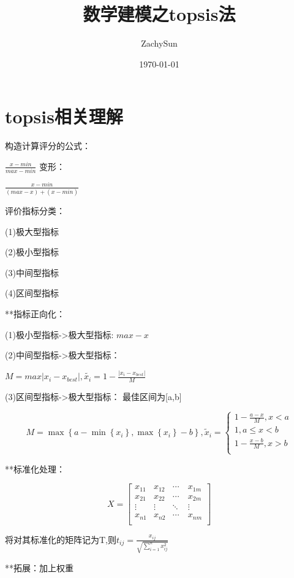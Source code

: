 \documentclass{article}
\title{数学建模之topsis法}
\date{\today}
\author{ZachySun}
\begin{document}
\maketitle
\section{topsis相关理解}

构造计算评分的公式：

$ \frac{x-min}{max-min} $
变形：

$ \frac{x-min}{(max-x)+(x-min)} $

评价指标分类：

(1)极大型指标

(2)极小型指标

(3)中间型指标

(4)区间型指标

**指标正向化：

(1)极小型指标->极大型指标: $max-x$

(2)中间型指标->极大型指标：

$M=max{|x_{i}-x_{best}|}, \tilde{x_{i}}=1-\frac{|x_{i}-x_{best}|}{M}$

(3)区间型指标->极大型指标：
最佳区间为[a,b]

$$
M=\max \left\{ a-\min \left\{ x_i \right\} ,\max \left\{ x_i \right\} -b \right\} , \tilde{x}_i=\begin{cases}
	1-\frac{a-x}{M}, x<a\\
	1,    a\leq x<b\\
	1-\frac{x-b}{M}, x>b\\
\end{cases}
$$

**标准化处理：

$$
X
=\begin{bmatrix}
x_{11}  &  x_{12}  & \cdots\ &x_{1m}\\
x_{21}  &  x_{22}  & \cdots\ & x_{2m}\\
\vdots   & \vdots & \ddots  & \vdots  \\
x_{n1} & x_{n2}  & \cdots\ & x_{nm}\\
\end{bmatrix}
$$

将对其标准化的矩阵记为T,则$t_{ij}=\frac{x_{ij}}{\sqrt{\sum_{i=1}^{n} x_{ij}^{2} } } $

**拓展：加上权重
\end{document}
